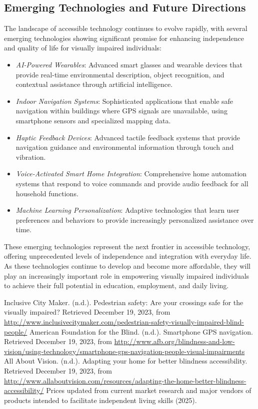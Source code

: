 \subsection{Emerging Technologies and Future Directions}\label{emerging-tech}
The landscape of accessible technology continues to evolve rapidly, with several emerging technologies showing significant promise for enhancing independence and quality of life for visually impaired individuals:

\begin{itemize}
 \item \emph{AI-Powered Wearables}: Advanced smart glasses and wearable devices that provide real-time environmental description, object recognition, and contextual assistance through artificial intelligence.
 \item \emph{Indoor Navigation Systems}: Sophisticated applications that enable safe navigation within buildings where GPS signals are unavailable, using smartphone sensors and specialized mapping data.
 \item \emph{Haptic Feedback Devices}: Advanced tactile feedback systems that provide navigation guidance and environmental information through touch and vibration.
 \item \emph{Voice-Activated Smart Home Integration}: Comprehensive home automation systems that respond to voice commands and provide audio feedback for all household functions.
 \item \emph{Machine Learning Personalization}: Adaptive technologies that learn user preferences and behaviors to provide increasingly personalized assistance over time.
\end{itemize}

These emerging technologies represent the next frontier in accessible technology, offering unprecedented levels of independence and integration with everyday life. As these technologies continue to develop and become more affordable, they will play an increasingly important role in empowering visually impaired individuals to achieve their full potential in education, employment, and daily living.
\begin{thebibliography}{99}
 Inclusive City Maker. (n.d.). Pedestrian safety: Are your crossings safe for the visually impaired? Retrieved December 19, 2023, from \url{http://www.inclusivecitymaker.com/pedestrian-safety-visually-impaired-blind-people/}
 American Foundation for the Blind. (n.d.). Smartphone GPS navigation. Retrieved December 19, 2023, from \url{http://www.afb.org/blindness-and-low-vision/using-technology/smartphone-gps-navigation-people-visual-impairments}
 All About Vision. (n.d.). Adapting your home for better blindness accessibility. Retrieved December 19, 2023, from \url{http://www.allaboutvision.com/resources/adapting-the-home-better-blindness-accessibility/}
 Prices updated from current market research and major vendors of products intended to facilitate independent living skills (2025).
\end{thebibliography}

